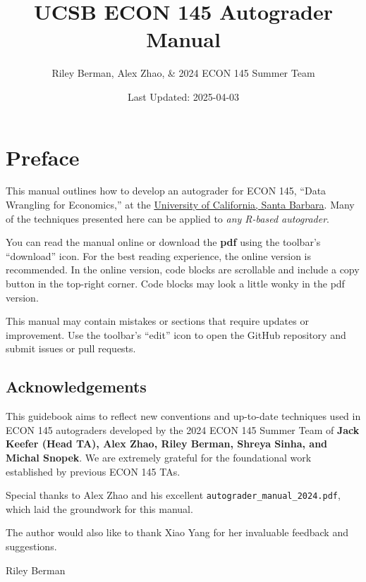\documentclass[
  12pt,
]{book}
\title{UCSB ECON 145 Autograder Manual}
\author{Riley Berman, Alex Zhao, \& 2024 ECON 145 Summer Team}
\date{Last Updated: 2025-04-03}
\begin{document}
\maketitle

{
\hypersetup{linkcolor=}
\setcounter{tocdepth}{1}
\tableofcontents
}
\chapter*{Preface}\label{preface}

This manual outlines how to develop an autograder for ECON 145, ``Data Wrangling for Economics,'' at the \href{https://econ.ucsb.edu/programs/undergraduate/courses}{University of California, Santa Barbara}. Many of the techniques presented here can be applied to \emph{any R-based autograder}.

You can read the manual online or download the \textbf{pdf} using the toolbar's ``download'' icon. For the best reading experience, the online version is recommended. In the online version, code blocks are scrollable and include a copy button in the top-right corner. Code blocks may look a little wonky in the pdf version.

This manual may contain mistakes or sections that require updates or improvement. Use the toolbar's ``edit'' icon to open the GitHub repository and submit issues or pull requests.

\section*{Acknowledgements}\label{Acknowledgements}

This guidebook aims to reflect new conventions and up-to-date techniques used in ECON 145 autograders developed by the 2024 ECON 145 Summer Team of \textbf{Jack Keefer (Head TA), Alex Zhao, Riley Berman, Shreya Sinha, and Michal Snopek}. We are extremely grateful for the foundational work established by previous ECON 145 TAs.

Special thanks to Alex Zhao and his excellent \texttt{autograder\_manual\_2024.pdf}, which laid the groundwork for this manual.

The author would also like to thank Xiao Yang for her invaluable feedback and suggestions.

\begin{flushright}
Riley Berman
\end{flushright}
\end{document}
